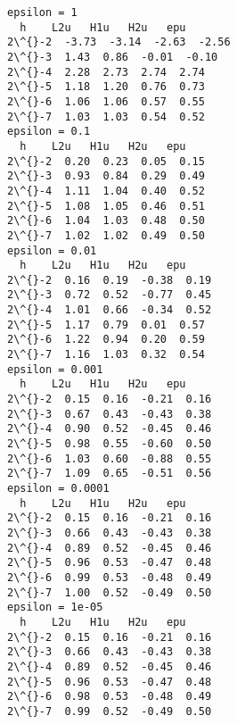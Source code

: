 \documentclass[11pt]{article}
\begin{document}
    \begin{Verbatim}[commandchars=\\\{\}]
epsilon = 1
  h    L2u   H1u   H2u   epu
2\^{}-2  -3.73  -3.14  -2.63  -2.56
2\^{}-3  1.43  0.86  -0.01  -0.10
2\^{}-4  2.28  2.73  2.74  2.74
2\^{}-5  1.18  1.20  0.76  0.73
2\^{}-6  1.06  1.06  0.57  0.55
2\^{}-7  1.03  1.03  0.54  0.52
epsilon = 0.1
  h    L2u   H1u   H2u   epu
2\^{}-2  0.20  0.23  0.05  0.15
2\^{}-3  0.93  0.84  0.29  0.49
2\^{}-4  1.11  1.04  0.40  0.52
2\^{}-5  1.08  1.05  0.46  0.51
2\^{}-6  1.04  1.03  0.48  0.50
2\^{}-7  1.02  1.02  0.49  0.50
epsilon = 0.01
  h    L2u   H1u   H2u   epu
2\^{}-2  0.16  0.19  -0.38  0.19
2\^{}-3  0.72  0.52  -0.77  0.45
2\^{}-4  1.01  0.66  -0.34  0.52
2\^{}-5  1.17  0.79  0.01  0.57
2\^{}-6  1.22  0.94  0.20  0.59
2\^{}-7  1.16  1.03  0.32  0.54
epsilon = 0.001
  h    L2u   H1u   H2u   epu
2\^{}-2  0.15  0.16  -0.21  0.16
2\^{}-3  0.67  0.43  -0.43  0.38
2\^{}-4  0.90  0.52  -0.45  0.46
2\^{}-5  0.98  0.55  -0.60  0.50
2\^{}-6  1.03  0.60  -0.88  0.55
2\^{}-7  1.09  0.65  -0.51  0.56
epsilon = 0.0001
  h    L2u   H1u   H2u   epu
2\^{}-2  0.15  0.16  -0.21  0.16
2\^{}-3  0.66  0.43  -0.43  0.38
2\^{}-4  0.89  0.52  -0.45  0.46
2\^{}-5  0.96  0.53  -0.47  0.48
2\^{}-6  0.99  0.53  -0.48  0.49
2\^{}-7  1.00  0.52  -0.49  0.50
epsilon = 1e-05
  h    L2u   H1u   H2u   epu
2\^{}-2  0.15  0.16  -0.21  0.16
2\^{}-3  0.66  0.43  -0.43  0.38
2\^{}-4  0.89  0.52  -0.45  0.46
2\^{}-5  0.96  0.53  -0.47  0.48
2\^{}-6  0.98  0.53  -0.48  0.49
2\^{}-7  0.99  0.52  -0.49  0.50
    \end{Verbatim}


    
    
    
\end{document}
